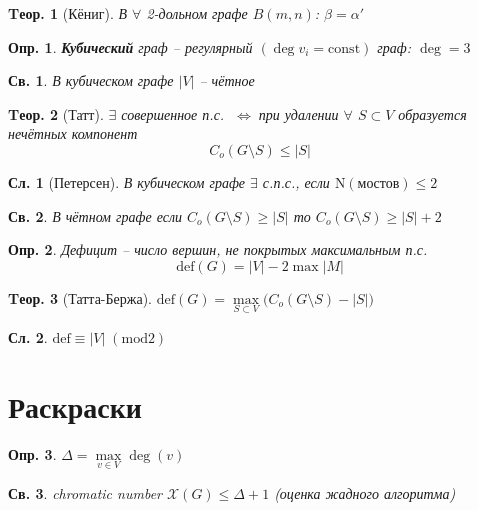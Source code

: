 \documentclass[a4paper,12pt]{article}
\newtheorem{definition}{Опр.}[section]
\newtheorem{property}{Св.}[definition]
\newtheorem{theorem}{Tеор.}[section]
\newtheorem{corollary}{Сл.}[theorem]
\def\iiff{$\;\Longleftrightarrow\;$}
\def\iiChi{\mathcal{X}}
\begin{document}
\begin{theorem}[Кёниг]
	В $\forall$ 2-дольном графе $B(m,n)$: $\beta = \alpha'$
\end{theorem}

\begin{definition}
	\textbf{Кубический} граф -- регулярный $(\deg v_i = \mathrm{const})$ граф: $\deg = 3$
\end{definition}

\begin{property}
	В кубическом графе $|V|$ -- чётное
\end{property}

\begin{theorem}[Татт]
	$\exists$ совершенное п.с. \iiff при удалении $\forall$ $S \subset V$ образуется нечётных компонент
	\[ C_{o}(G \setminus S) \leqslant |S| \]
\end{theorem}

\begin{corollary}[Петерсен]
	В кубическом графе $\exists$ с.п.с., если $\mathrm{N}(мостов) \leqslant 2$
\end{corollary}

\begin{property}
В чётном графе если $C_{o}(G \setminus S) \ge |S|$ то $C_{o}(G \setminus S) \geqslant |S|+2$
\end{property}

\begin{definition}
	Дефицит -- число вершин, не покрытых максимальным п.с.
	\[ \mathrm{def}(G)=|V|-2\max|M| \]
\end{definition}

\begin{theorem}[Татта-Бержа]
	$ \mathrm{def}(G) = \max\limits_{S \subset V} \big( C_{o}(G \setminus S) - \left|S\right| \big) $
\end{theorem}

\begin{corollary}
	$ \mathrm{def} \equiv |V| \; (\mathrm{mod} 2) $
\end{corollary}

\section{Раскраски}

\begin{definition} $\Delta = \max \limits_{v \in V} \deg(v)$ \end{definition}

\begin{property}
	chromatic number $\iiChi(G) \leqslant \Delta + 1$ (оценка жадного алгоритма)
\end{property}
\end{document}
